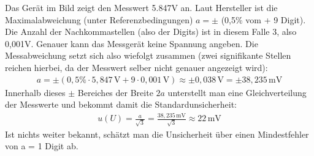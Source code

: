 \documentclass[letterpaper,10pt,english]{jupyterBook}
\begin{document}
\sphinxAtStartPar
Das Gerät im Bild zeigt den Messwert 5.847V an. Laut Hersteller ist die Maximalabweichung (unter Referenzbedingungen) \(a = \pm\) (0,5\% vom  + 9 Digit). Die Anzahl der Nachkommastellen (also der Digits) ist in diesem Falle 3, also 0,001V. Genauer kann das Messgerät keine Spannung angeben. Die Messabweichung setzt sich also wiefolgt zusammen (zwei signifikante Stellen reichen hierbei, da der Messwert selber nicht genauer angezeigt wird):
\begin{equation*}
\begin{split}a = \pm (0,5\% \cdot 5,847\,\mathrm{V} + 9 \cdot 0,001\,\mathrm V) \approx \pm 0,038\,\mathrm V = \pm 38,235\,\mathrm{mV}\end{split}
\end{equation*}
\sphinxAtStartPar
Innerhalb dieses \(\pm\) Bereiches der Breite \(2a\) unterstellt man eine Gleichverteilung der Messwerte und bekommt damit die Standardunsicherheit:
\begin{equation*}
\begin{split}u(U) = \frac{a}{\sqrt{3}} = \frac{38,235\,\mathrm{mV}}{\sqrt{3}} \approx 22\,\mathrm{mV}\end{split}
\end{equation*}
\sphinxAtStartPar
Ist nichts weiter bekannt, schätzt man die Unsicherheit über einen Mindestfehler von a = 1 Digit ab.
\end{document}
